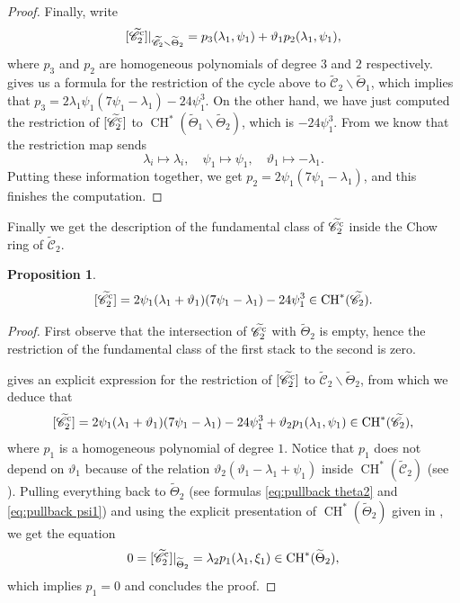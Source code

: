 \documentclass[a4paper, 10pt]{amsart}
\numberwithin{equation}{section}
\numberwithin{subsection}{section}
\newtheorem{proposition}[theorem]{Proposition}
\theoremstyle{definition}
\theoremstyle{remark}
\renewcommand{\mathcal}{\mathscr}
\renewcommand{\setminus}{\smallsetminus}
\newcommand{\Ctilde}{\widetilde{\mathcal C}}
\newcommand{\ThTilde}{\widetilde{\Theta}}
\newcommand{\ch}[1][*]{\operatorname{CH}^{#1}}
\begin{document}
\begin{proof}
		Finally, write $$[\Ctilde_2^{\rm c}]\vert_{\Ctilde_2\setminus \ThTilde_2}= p_3(\lambda_1,\psi_1)+\vartheta_1p_2(\lambda_1,\psi_1),$$ where $p_3$ and $p_2$ are homogeneous polynomials of degree $3$ and $2$ respectively.  gives us a formula for the restriction of the cycle above to $\Ctilde_2 \setminus \ThTilde_1$, which implies that $p_3=2\lambda_1\psi_1(7\psi_1-\lambda_1) - 24 \psi_1^3$. 
		On the other hand, we have just computed the restriction of $[\Ctilde_2^{\rm c}]$ to $\ch(\ThTilde_1\smallsetminus\ThTilde_2)$, which is $-24\psi_1^3$. From  we know that the restriction map sends
		\[ \lambda_i\longmapsto \lambda_i,\quad \psi_1\longmapsto\psi_1,\quad \vartheta_1\longmapsto -\lambda_1.  \]
		Putting these information together, we get $p_2=2\psi_1(7\psi_1-\lambda_1)$, and this finishes the computation.
	\end{proof}
	
	Finally we get the description of the fundamental class of $\Ctilde_2^{\rm c}$ inside the Chow ring of $\Ctilde_2$.
	
	\begin{proposition}\label{prop:class Ctilde2 c}
		$$ [\Ctilde_2^{\rm c}] = 2\psi_1(\lambda_1 +\vartheta_1)(7\psi_1-\lambda_1) - 24\psi_1^3 \in \ch(\Ctilde_2). $$
	\end{proposition}
	
	\begin{proof}
		First observe that the intersection of $\Ctilde_2^{\rm c}$ with $\ThTilde_2$ is empty, hence the restriction of the fundamental class of the first stack to the second is zero.
		
		 gives an explicit expression for the restriction of $[\Ctilde_2^{\rm c}]$ to $\Ctilde_2\smallsetminus\ThTilde_2$, from which we deduce that
		$$ [\Ctilde_2^{\rm c}]= 2\psi_1(\lambda_1+\vartheta_1)(7\psi_1-\lambda_1)- 24\psi_1^3 + \vartheta_2 p_1(\lambda_1,\psi_1) \in \ch(\Ctilde_2),$$
		where $p_1$ is a homogeneous polynomial of degree $1$. Notice that $p_1$ does not depend on $\vartheta_1$ because of the relation $\vartheta_2(\vartheta_1 -\lambda_1 + \psi_1)$ inside $\ch(\Ctilde_2)$ (see ). Pulling everything back to $\ThTilde_2$ (see formulas \eqref{eq:pullback theta2} and \eqref{eq:pullback psi1}) and using the explicit presentation of $\ch(\ThTilde_2)$ given in , we get the equation 
		$$ 0=[\Ctilde_2^{\rm c}]\vert_{\ThTilde_2}=\lambda_2 p_1(\lambda_1,\xi_1) \in \ch(\ThTilde_2),$$
		which implies $p_1=0$ and concludes the proof.
	\end{proof}
	
\end{document}
